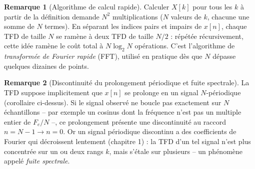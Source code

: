 \documentclass[a4paper,11pt]{article}
\theoremstyle{definition}
\newtheorem{remark}{Remarque}[section]
\newcommand{\highlight}[1]{{\color{niceblue}\emph{#1}}}
\begin{document}
\begin{remark}[Algorithme de calcul rapide]
    Calculer $X[k]$ pour tous les $k$ à partir de la définition demande
    $N^2$ multiplications ($N$ valeurs de $k$, chacune une somme de $N$
    termes). En séparant les indices pairs et impairs de $x[n]$, chaque
    TFD de taille $N$ se ramène à deux TFD de taille $N/2$ : répétée
    récursivement, cette idée ramène le coût total à $N\log_2N$
    opérations. C'est l'algorithme de \highlight{transformée de Fourier
    rapide} (FFT), utilisé en pratique dès que $N$ dépasse quelques
    dizaines de points.
\end{remark}

\begin{remark}[Discontinuité du prolongement périodique et fuite spectrale]
    La TFD suppose implicitement que $x[n]$ se prolonge en un signal
    $N$-périodique (corollaire ci-dessus). Si le signal observé ne
    boucle pas exactement sur $N$ échantillons -- par exemple un
    cosinus dont la fréquence n'est pas un multiple entier de $F_e/N$ --,
    ce prolongement présente une discontinuité au raccord
    $n=N-1\to n=0$. Or un signal périodique discontinu a des
    coefficients de Fourier qui décroissent lentement (chapitre 1) : la
    TFD d'un tel signal n'est plus concentrée sur un ou deux rangs $k$,
    mais s'étale sur plusieurs -- un phénomène appelé
    \highlight{fuite spectrale}.
\end{remark}
\end{document}
